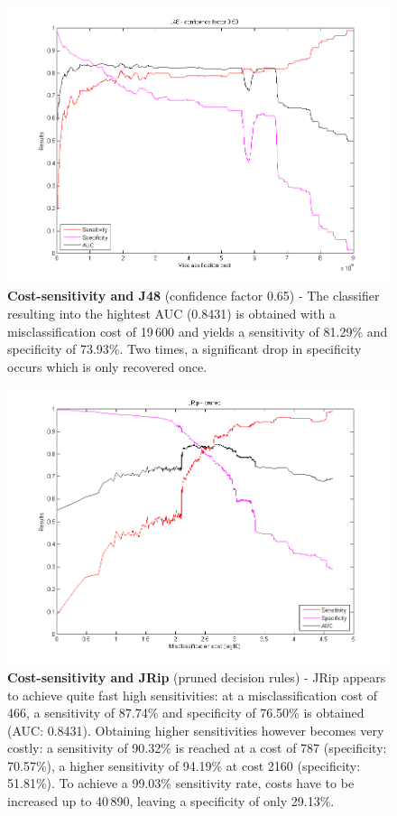 \newpage
\begin{figure}[h]
\includegraphics[scale=0.65]{img/J48-confid050.png}
\caption{\textbf{Cost-sensitivity and J48} (confidence factor 0.65) - The classifier resulting into the hightest AUC (0.8431) is obtained with a misclassification cost of 19\,600 and yields a sensitivity of 81.29\% and specificity of 73.93\%.  Two times, a significant drop in specificity occurs which is only recovered once.}
\end{figure}

\newpage
\begin{figure}[h]
\includegraphics[scale=0.65]{img/jrip.png}
\caption{\textbf{Cost-sensitivity and JRip} (pruned decision rules) - JRip appears to achieve quite fast high sensitivities: at a misclassification cost of 466, a sensitivity of 87.74\% and specificity of 76.50\% is obtained (AUC: 0.8431). Obtaining higher sensitivities however becomes very costly: a sensitivity of 90.32\% is reached at a cost of 787 (specificity: 70.57\%), a higher sensitivity of 94.19\% at cost 2160 (specificity: 51.81\%). To achieve a 99.03\% sensitivity rate, costs have to be increased up to  40\,890, leaving a specificity of only 29.13\%.}
\end{figure}

